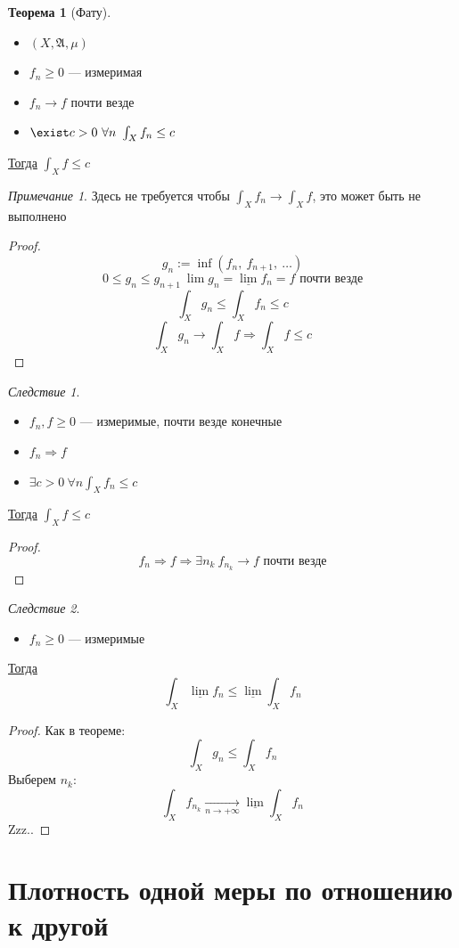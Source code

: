 \documentclass[oneside]{book}
\newcommand{\A}{\mathfrak{A}}
\theoremstyle{plain}
\theoremstyle{remark}
\newtheorem*{remark}{Примечание}
\newtheorem{corollary}{Следствие}[theorem]
\theoremstyle{definition}
\newtheorem{theorem}{Теорема}[section]
\begin{document}
\begin{theorem}[Фату]
\begin{itemize}
\item \((X, \A, \mu)\)
\item \(f_n \ge 0\) --- измеримая
\item \(f_n \to f\) почти везде
\item \(\exist c > 0\ \forall n\ \int_X f_n \le c\)
\end{itemize}
\uline{Тогда} \(\int_X f \le c\) \\
\end{theorem}
\begin{remark}
Здесь не требуется чтобы \(\int_X f_n \to \int_X f\), это может быть не выполнено
\end{remark}
\begin{proof}
\[ g_n := \inf(f_n,\ f_{n + 1},\ \dots) \]
\[ 0 \le g_n \le g_{n + 1}\ \lim g_n = \underline{\lim} f_n = f\text{ почти везде} \]
\[ \int_X g_n \le \int_X f_n \le c \]
\[ \int_X g_n \to \int_X f \Rightarrow \int_X f \le c \]
\end{proof}
\begin{corollary}
\-
\begin{itemize}
\item \(f_n, f \ge 0\) --- измеримые, почти везде конечные
\item \(f_n \Rightarrow f\)
\item \(\exists c >0\ \forall n \int_X f_n \le c\)
\end{itemize}
\uline{Тогда} \(\int_X f \le c\)
\end{corollary}
\begin{proof}
\[ f_n \Rightarrow f \Rightarrow \exists n_k\ f_{n_k} \to f\text{ почти везде} \]
\end{proof}

\begin{corollary}
\-
\begin{itemize}
\item \(f_n \ge 0\) --- измеримые
\end{itemize}
\uline{Тогда} \[ \int_X \underline{\lim}f_n \le \underline{\lim}\int_X f_n \]
\end{corollary}
\begin{proof}
Как в теореме: \[ \int_X g_n \le \int_X f_n \]
Выберем \(n_k\): \[ \int_X f_{n_k} \xrightarrow[n \to + \infty]{} \underline{\lim}\int_X f_n \]
\color{red}Zzz..\color{black}
\end{proof}
\section{Плотность одной меры по отношению к другой}
\label{sec:org1ec14b1}
\end{document}
